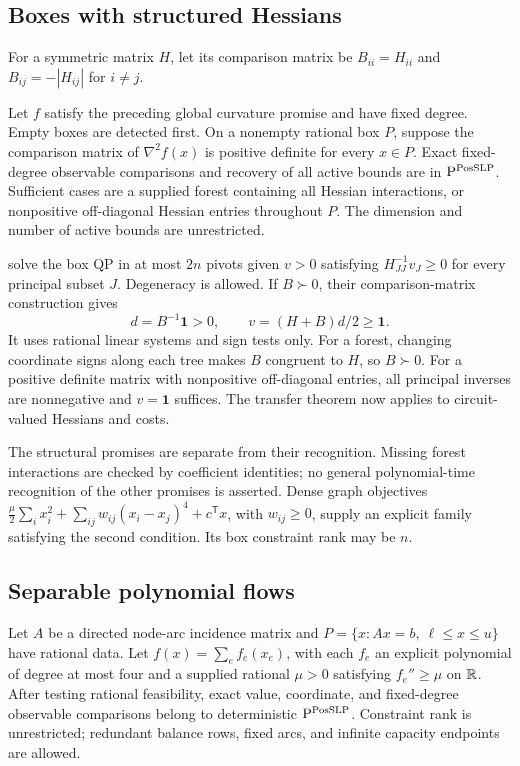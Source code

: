 \subsection{Boxes with structured Hessians}

For a symmetric matrix $H$, let its comparison matrix be
$B_{ii}=H_{ii}$ and $B_{ij}=-|H_{ij}|$ for $i\ne j$.

\begin{corollary}
\label{cor:structured-boxes}
Let $f$ satisfy the preceding global curvature promise and have fixed
degree. Empty boxes are detected first. On a nonempty rational box $P$, suppose the comparison matrix of
$\nabla^2f(x)$ is positive definite for every $x\in P$. Exact fixed-degree
observable comparisons and recovery of all active bounds are in
$\mathrm P^{\mathrm{PosSLP}}$. Sufficient cases are a supplied forest containing
all Hessian interactions, or nonpositive off-diagonal Hessian entries
throughout $P$. The dimension and number of active bounds are unrestricted.
\end{corollary}

\citet[Algorithm~I and Proposition~2.1]{PangHan2023} solve the box QP in
at most $2n$ pivots given $v>0$ satisfying
$H_{JJ}^{-1}v_J\ge0$ for every principal subset $J$. Degeneracy is
allowed. If $B\succ0$, their comparison-matrix construction gives
\[
 d=B^{-1}\mathbf1>0,\qquad v=(H+B)d/2\ge\mathbf1.
\]
It uses rational linear systems and sign tests only. For a forest, changing
coordinate signs along each tree makes $B$ congruent to $H$, so $B\succ0$.
For a positive definite matrix with nonpositive off-diagonal entries,
all principal inverses are nonnegative and $v=\mathbf1$ suffices.
The transfer theorem now applies to circuit-valued Hessians and costs.

The structural promises are separate from their recognition. Missing
forest interactions are checked by coefficient identities; no general
polynomial-time recognition of the other promises is asserted. Dense
graph objectives
$\frac\mu2\sum_i x_i^2+\sum_{ij}w_{ij}(x_i-x_j)^4+c^{\mathsf T}x$,
with $w_{ij}\ge0$, supply an explicit family satisfying the second condition.
Its box constraint rank may be $n$.

\subsection{Separable polynomial flows}

\begin{corollary}
\label{cor:polynomial-flow}
Let $A$ be a directed node-arc incidence matrix and
$P=\{x:Ax=b,\ \ell\le x\le u\}$ have rational data. Let
$f(x)=\sum_e f_e(x_e)$, with each $f_e$ an explicit polynomial of degree at most four and a supplied
rational $\mu>0$ satisfying $f_e''\ge\mu$ on $\mathbb R$. After testing rational
feasibility, exact value,
coordinate, and fixed-degree observable comparisons belong to deterministic
$\mathrm P^{\mathrm{PosSLP}}$. Constraint rank is unrestricted; redundant balance
rows, fixed arcs, and infinite capacity endpoints are allowed.
\end{corollary}

